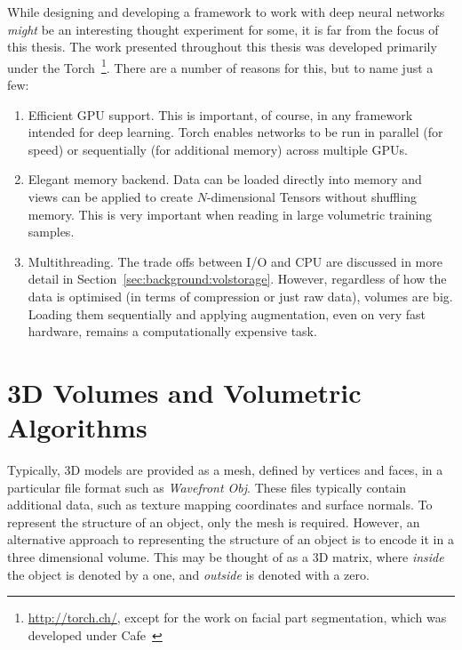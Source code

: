 While designing and developing a framework to work with deep neural
networks \textit{might} be an interesting thought experiment for some,
it is far from the focus of this thesis. The work presented throughout
this thesis was developed primarily under the
Torch~\footnote{\url{http://torch.ch/}, except for the work on facial
  part segmentation, which was developed under
  Cafe~\cite{jia2014caffe}}. There are a number of reasons for this,
but to name just a few:

\begin{enumerate}
\item Efficient GPU support. This is important, of course, in any
  framework intended for deep learning. Torch enables networks to be
  run in parallel (for speed) or sequentially (for additional memory)
  across multiple GPUs.
\item Elegant memory backend. Data can be loaded directly into memory
  and views can be applied to create $N$-dimensional Tensors without
  shuffling memory. This is very important when reading in large
  volumetric training samples.
\item Multithreading. The trade offs between I/O and CPU are discussed
  in more detail in Section~\ref{sec:background:volstorage}. However,
  regardless of how the data is optimised (in terms of compression or
  just raw data), volumes are big. Loading them sequentially and
  applying augmentation, even on very fast hardware, remains a
  computationally expensive task.
\end{enumerate}


\section{3D Volumes and Volumetric Algorithms}

Typically, 3D models are provided as a mesh, defined by vertices and
faces, in a particular file format such as \textit{Wavefront
  Obj}. These files typically contain additional data, such as texture
mapping coordinates and surface normals. To represent the structure of
an object, only the mesh is required. However, an alternative approach
to representing the structure of an object is to encode it in a three
dimensional volume. This may be thought of as a 3D matrix, where
\textit{inside} the object is denoted by a one, and \textit{outside}
is denoted with a zero.

